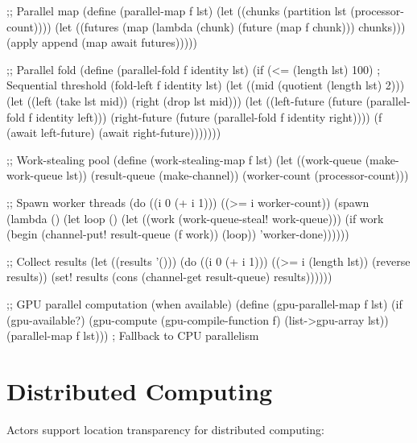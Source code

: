 \begin{example}
\begin{lambdustcode}
;; Parallel map
(define (parallel-map f lst)
  (let ((chunks (partition lst (processor-count))))
    (let ((futures (map (lambda (chunk) (future (map f chunk))) chunks)))
      (apply append (map await futures)))))

;; Parallel fold  
(define (parallel-fold f identity lst)
  (if (<= (length lst) 100)   ; Sequential threshold
      (fold-left f identity lst)
      (let ((mid (quotient (length lst) 2)))
        (let ((left (take lst mid))
              (right (drop lst mid)))
          (let ((left-future (future (parallel-fold f identity left)))
                (right-future (future (parallel-fold f identity right))))
            (f (await left-future) (await right-future)))))))

;; Work-stealing pool
(define (work-stealing-map f lst)
  (let ((work-queue (make-work-queue lst))
        (result-queue (make-channel))
        (worker-count (processor-count)))
    
    ;; Spawn worker threads
    (do ((i 0 (+ i 1)))
        ((>= i worker-count))
      (spawn 
        (lambda ()
          (let loop ()
            (let ((work (work-queue-steal! work-queue)))
              (if work
                  (begin 
                    (channel-put! result-queue (f work))
                    (loop))
                  'worker-done))))))
    
    ;; Collect results
    (let ((results '()))
      (do ((i 0 (+ i 1)))
          ((>= i (length lst)) (reverse results))
        (set! results (cons (channel-get result-queue) results))))))

;; GPU parallel computation (when available)
(define (gpu-parallel-map f lst)
  (if (gpu-available?)
      (gpu-compute (gpu-compile-function f) (list->gpu-array lst))
      (parallel-map f lst)))   ; Fallback to CPU parallelism
\end{lambdustcode}
\end{example}

\section{Distributed Computing}
\label{sec:distributed}


Actors support location transparency for distributed computing:

